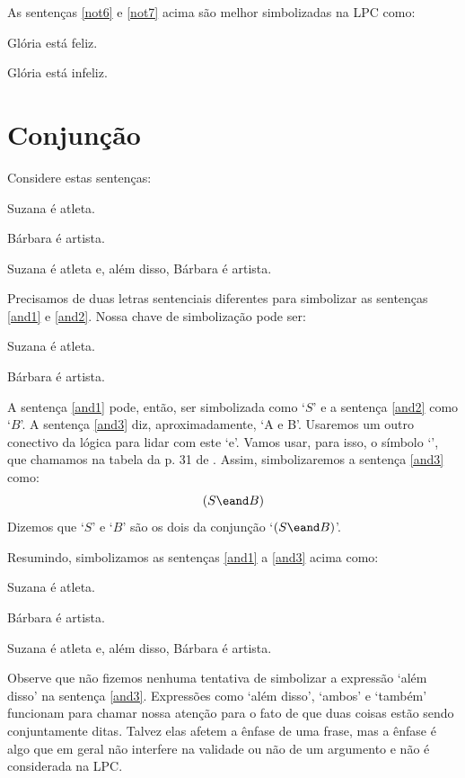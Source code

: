 As sentenças \ref{not6} e \ref{not7} acima são melhor simbolizadas na LPC como:
	\begin{ekey}
		\item[F] Glória está feliz.
		\item[I] Glória está infeliz.
	\end{ekey}

\section{Conjunção}
\label{s:ConnectiveConjunction}

Considere estas sentenças:
	\begin{earg}
		\item[\ex{and1}]Suzana é atleta.
		\item[\ex{and2}]Bárbara é artista.
		\item[\ex{and3}]Suzana é atleta e, além disso, Bárbara é artista.
	\end{earg}
Precisamos de duas letras sentenciais diferentes para simbolizar as sentenças \ref{and1} e \ref{and2}.
Nossa chave de simbolização pode ser:
	\begin{ekey}
		\item[S] Suzana é atleta.
		\item[B] Bárbara é artista.
	\end{ekey}
A sentença \ref{and1} pode, então, ser simbolizada como `$S$' e a sentença \ref{and2} como `$B$'.
A sentença \ref{and3} diz, aproximadamente, `A e B'.
Usaremos um outro conectivo da lógica para lidar com este `e'.
Vamos usar, para isso, o símbolo `\eand', que chamamos na tabela da p. 31 de .
Assim, simbolizaremos a sentença \ref{and3} como:
$$(S \eand B)$$
Dizemos que `$S$' e `$B$' são os dois  da conjunção `$(S \eand B)$'.

Resumindo, simbolizamos as sentenças  \ref{and1} a \ref{and3} acima como:
	\begin{ekey}
		\item[S]Suzana é atleta.
		\item[B]Bárbara é artista.
		\item[$($S$\eand$B$)$]Suzana é atleta e, além disso, Bárbara é artista.
	\end{ekey}
Observe que não fizemos nenhuma tentativa de simbolizar a expressão `além disso' na sentença \ref{and3}.
Expressões como `além disso', `ambos' e `também' funcionam para chamar nossa atenção para o fato de que duas coisas estão sendo conjuntamente ditas.
Talvez elas afetem a ênfase de uma frase, mas a ênfase é algo que em geral não interfere na validade ou não de um argumento e não é considerada na LPC.

